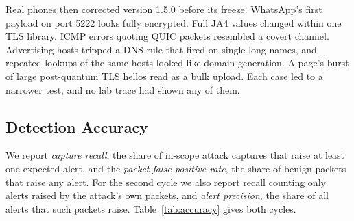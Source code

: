 \documentclass[runningheads]{llncs}
\begin{document}
Real phones then corrected version 1.5.0 before its freeze. WhatsApp's first payload on port 5222 looks fully encrypted. Full JA4 values changed within one TLS library. ICMP errors quoting QUIC packets resembled a covert channel. Advertising hosts tripped a DNS rule that fired on single long names, and repeated lookups of the same hosts looked like domain generation. A page's burst of large post-quantum TLS hellos read as a bulk upload. Each case led to a narrower test, and no lab trace had shown any of them.

\subsection{Detection Accuracy}\label{sec:accuracy}

We report \emph{capture recall}, the share of in-scope attack captures that raise at least one expected alert, and the \emph{packet false positive rate}, the share of benign packets that raise any alert. For the second cycle we also report recall counting only alerts raised by the attack's own packets, and \emph{alert precision}, the share of all alerts that such packets raise. Table~\ref{tab:accuracy} gives both cycles.
\end{document}

